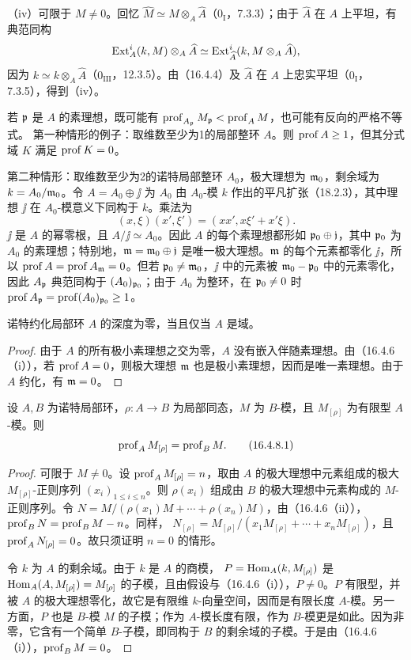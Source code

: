 （iv）可限于 $M\ne0$。回忆 $\widehat M\simeq M\otimes_A\widehat A$（$0_{\mathrm I}$，7.3.3）；由于 $\widehat A$ 在 $A$ 上平坦，有典范同构
\[
 \operatorname{Ext}_A^i(k,M)\otimes_A\widehat A
 \simeq\operatorname{Ext}_{\widehat A}^i(k,M\otimes_A\widehat A),
\]
因为 $k\simeq k\otimes_A\widehat A$（$0_{\mathrm{III}}$，12.3.5）。由（16.4.4）及 $\widehat A$ 在 $A$ 上忠实平坦（$0_{\mathrm I}$，7.3.5），得到（iv）。

若 $\mathfrak p$ 是 $A$ 的素理想，既可能有
$\operatorname{prof}_{A_{\mathfrak p}}M_{\mathfrak p}<\operatorname{prof}_A M$，也可能有反向的严格不等式。
第一种情形的例子：取维数至少为1的局部整环 $A$。则 $\operatorname{prof} A\geq1$，但其分式域 $K$ 满足 $\operatorname{prof} K=0$。

第二种情形：取维数至少为2的诺特局部整环 $A_0$，极大理想为 $\mathfrak m_0$，剩余域为 $k=A_0/\mathfrak m_0$。令 $A=A_0\oplus\jj$ 为 $A_0$ 由 $A_0$-模 $k$ 作出的平凡扩张（18.2.3），其中理想 $\jj$ 在 $A_0$-模意义下同构于 $k$。乘法为
\[
 (x,\xi)(x',\xi')=(xx',x\xi'+x'\xi).
\]
$\jj$ 是 $A$ 的幂零根，且 $A/\jj\simeq A_0$。因此 $A$ 的每个素理想都形如 $\mathfrak p_0\oplus\mathfrak j$，其中 $\mathfrak p_0$ 为 $A_0$ 的素理想；特别地，$\mathfrak m=\mathfrak m_0\oplus\mathfrak j$ 是唯一极大理想。$\mathfrak m$ 的每个元素都零化 $\jj$，所以 $\operatorname{prof} A=\operatorname{prof} A_{\mathfrak m}=0$。但若 $\mathfrak p_0\ne\mathfrak m_0$，$\jj$ 中的元素被 $\mathfrak m_0-\mathfrak p_0$ 中的元素零化，因此 $A_{\mathfrak p}$ 典范同构于 $(A_0)_{\mathfrak p_0}$；由于 $A_0$ 为整环，在 $\mathfrak p_0\ne0$ 时 $\operatorname{prof} A_{\mathfrak p}=\operatorname{prof}(A_0)_{\mathfrak p_0}\geq1$。

诺特约化局部环 $A$ 的深度为零，当且仅当 $A$ 是域。
\begin{proof}
由于 $A$ 的所有极小素理想之交为零，$A$ 没有嵌入伴随素理想。由（16.4.6（i）），若 $\operatorname{prof} A=0$，则极大理想 $\mathfrak m$ 也是极小素理想，因而是唯一素理想。由于 $A$ 约化，有 $\mathfrak m=0$。
\end{proof}

设 $A,B$ 为诺特局部环，$\rho:A\to B$ 为局部同态，$M$ 为 $B$-模，且 $M_{[\rho]}$ 为有限型 $A$-模。则
\begin{equation}
 \operatorname{prof}_A M_{[\rho]}=\operatorname{prof}_B M.
 \tag{16.4.8.1}
\end{equation}
\begin{proof}
可限于 $M\ne0$。设 $\operatorname{prof}_A M_{[\rho]}=n$，取由 $A$ 的极大理想中元素组成的极大 $M_{[\rho]}$-正则序列 $(x_i)_{1\leq i\leq n}$。则 $\rho(x_i)$ 组成由 $B$ 的极大理想中元素构成的 $M$-正则序列。令
$N=M/(\rho(x_1)M+\cdots+\rho(x_n)M)$，由（16.4.6（ii）），
$\operatorname{prof}_B N=\operatorname{prof}_B M-n$。同样，
$N_{[\rho]}=M_{[\rho]}/(x_1M_{[\rho]}+\cdots+x_nM_{[\rho]})$，且 $\operatorname{prof}_A N_{[\rho]}=0$。故只须证明 $n=0$ 的情形。

令 $k$ 为 $A$ 的剩余域。由于 $k$ 是 $A$ 的商模，
$P=\operatorname{Hom}_A(k,M_{[\rho]})$ 是 $\operatorname{Hom}_A(A,M_{[\rho]})=M_{[\rho]}$ 的子模，且由假设与（16.4.6（i）），$P\ne0$。$P$ 有限型，并被 $A$ 的极大理想零化，故它是有限维 $k$-向量空间，因而是有限长度 $A$-模。另一方面，$P$ 也是 $B$-模 $M$ 的子模；作为 $A$-模长度有限，作为 $B$-模更是如此。因为非零，它含有一个简单 $B$-子模，即同构于 $B$ 的剩余域的子模。于是由（16.4.6（i）），$\operatorname{prof}_B M=0$。
\end{proof}

